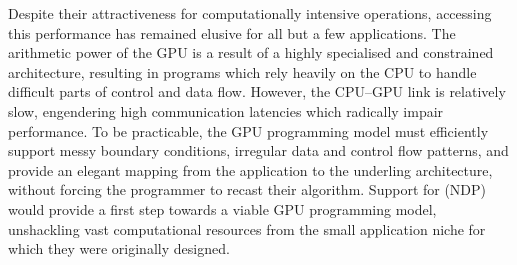 Despite their attractiveness for computationally intensive operations, accessing
this performance has remained elusive for all but a few applications. The
arithmetic power of the GPU is a result of a highly specialised and constrained
architecture, resulting in programs which rely heavily on the CPU to handle
difficult parts of control and data flow. However, the CPU--GPU link is
relatively slow, engendering high communication latencies which radically impair
performance. To be practicable, the GPU programming model must efficiently
support messy boundary conditions, irregular data and control flow patterns, and
provide an elegant mapping from the application to the underling architecture,
without forcing the programmer to recast their algorithm. Support for
\cite{Blelloch:1994,Blelloch:1996} (NDP) would
provide a first step towards a viable GPU programming model, unshackling vast
computational resources from the small application niche for which they were
originally designed.

